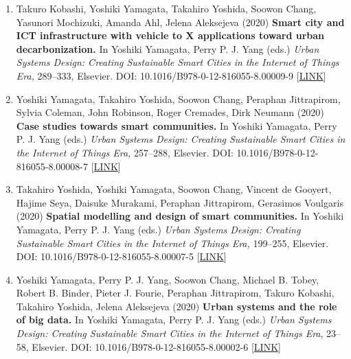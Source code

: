 \documentclass[
]{book}
\begin{document}
\begin{enumerate}
  \textbf{Measuring quality of walkable urban environment through experiential modeling.}
  In Yoshiki Yamagata, Perry P. J. Yang (eds.)
  \emph{Urban Systems Design: Creating Sustainable Smart Cities in the Internet of Things Era,} 373--392, Elsevier.
  DOI: 10.1016/B978-0-12-816055-8.00012-9 {[}\href{https://www.elsevier.com/books/urban-systems-design/yamagata/978-0-12-816055-8}{LINK}{]}
\item
  Takuro Kobashi, Yoshiki Yamagata, Takahiro Yoshida, Soowon Chang, Yasunori Mochizuki, Amanda Ahl, Jelena Aleksejeva (2020)
  \textbf{Smart city and ICT infrastructure with vehicle to X applications toward urban decarbonization.}
  In Yoshiki Yamagata, Perry P. J. Yang (eds.)
  \emph{Urban Systems Design: Creating Sustainable Smart Cities in the Internet of Things Era,} 289--333, Elsevier.
  DOI: 10.1016/B978-0-12-816055-8.00009-9 {[}\href{https://www.elsevier.com/books/urban-systems-design/yamagata/978-0-12-816055-8}{LINK}{]}
\item
  Yoshiki Yamagata, Takahiro Yoshida, Soowon Chang, Peraphan Jittrapirom, Sylvia Coleman, John Robinson, Roger Cremades, Dirk Neumann (2020)
  \textbf{Case studies towards smart communities.}
  In Yoshiki Yamagata, Perry P. J. Yang (eds.)
  \emph{Urban Systems Design: Creating Sustainable Smart Cities in the Internet of Things Era,} 257--288, Elsevier.
  DOI: 10.1016/B978-0-12-816055-8.00008-7 {[}\href{https://www.elsevier.com/books/urban-systems-design/yamagata/978-0-12-816055-8}{LINK}{]}
\item
  Takahiro Yoshida, Yoshiki Yamagata, Soowon Chang, Vincent de Gooyert, Hajime Seya, Daisuke Murakami, Peraphan Jittrapirom, Gerasimos Voulgaris (2020)
  \textbf{Spatial modelling and design of smart communities.}
  In Yoshiki Yamagata, Perry P. J. Yang (eds.)
  \emph{Urban Systems Design: Creating Sustainable Smart Cities in the Internet of Things Era,} 199--255, Elsevier.
  DOI: 10.1016/B978-0-12-816055-8.00007-5 {[}\href{https://www.elsevier.com/books/urban-systems-design/yamagata/978-0-12-816055-8}{LINK}{]}
\item
  Yoshiki Yamagata, Perry P. J. Yang, Soowon Chang, Michael B. Tobey, Robert B. Binder, Pieter J. Fourie, Peraphan Jittrapirom, Takuro Kobashi, Takahiro Yoshida, Jelena Aleksejeva (2020)
  \textbf{Urban systems and the role of big data.}
  In Yoshiki Yamagata, Perry P. J. Yang (eds.)
  \emph{Urban Systems Design: Creating Sustainable Smart Cities in the Internet of Things Era}, 23--58, Elsevier.
  DOI: 10.1016/B978-0-12-816055-8.00002-6 {[}\href{https://www.elsevier.com/books/urban-systems-design/yamagata/978-0-12-816055-8}{LINK}{]}

\end{enumerate}
\end{document}
